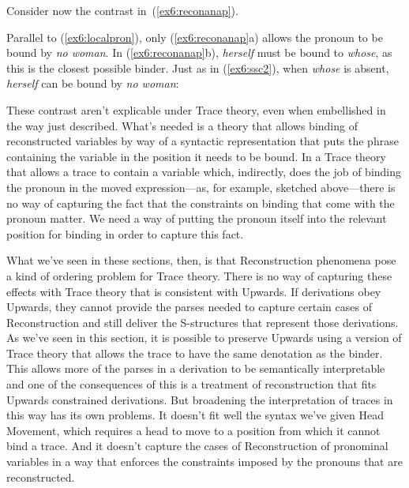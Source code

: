 Consider now the contrast in~(\ref{ex6:reconanap}).
\begin{exe}
\raggedright
	\ex \label{ex6:reconanap}
	\begin{xlist}
	\end{xlist}
\end{exe}
Parallel to (\ref{ex6:localpron}), only (\ref{ex6:reconanap}a) allows the pronoun to be bound by \emph{no woman}. In (\ref{ex6:reconanap}b), \emph{herself} must be bound to \emph{whose}, as this is the closest possible binder. Just as in (\ref{ex6:ssc2}), when \emph{whose} is absent, \emph{herself} can be bound by \emph{no woman}:
\begin{exe}
\raggedright
\end{exe}%
%
%
%
These contrast aren't explicable under Trace theory, even when embellished in the way just described. What's needed is a theory that allows binding of reconstructed variables by way of a syntactic representation that puts the phrase containing the variable in the position it needs to be bound. In a Trace theory that allows a trace to contain a variable which, indirectly, does the job of binding the pronoun in the moved expression---as, for example, sketched above---there is no way of capturing the fact that the constraints on binding that come with the pronoun matter. We need a way of putting the pronoun itself into the relevant position for binding in order to capture this fact.

What we've seen in these sections, then, is that Reconstruction phenomena pose a kind of ordering problem for Trace theory. There is no way of capturing these effects with Trace theory that is consistent with Upwards. If derivations obey Upwards, they cannot provide the parses needed to capture certain cases of Reconstruction and still deliver the S-structures that represent those derivations. As we've seen in this section, it is possible to preserve Upwards using a version of Trace theory that allows the trace to have the same denotation as the binder. This allows more of the parses in a derivation to be semantically interpretable and one of the consequences of this is a treatment of reconstruction that fits Upwards constrained derivations. But broadening the interpretation of traces in this way has its own problems. It doesn't fit well the syntax we've given Head Movement, which requires a head to move to a position from which it cannot bind a trace. And it doesn't capture the cases of Reconstruction of pronominal variables in a way that enforces the constraints imposed by the pronouns that are reconstructed. 

